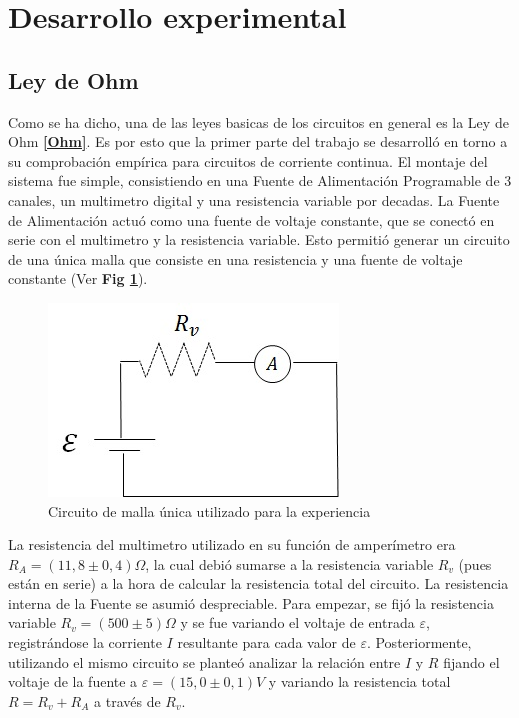 \documentclass[11pt,a4paper]{article}
\begin{document}
\section{Desarrollo experimental}

\subsection{Ley de Ohm}

Como se ha dicho, una de las leyes basicas de los circuitos en general es la Ley de Ohm \textbf{\eqref{Ohm}}. Es por esto que la primer parte del trabajo se desarrolló en torno a su comprobación empírica para circuitos de corriente continua. El montaje del sistema fue simple, consistiendo en una Fuente de Alimentación Programable de 3 canales, un multimetro digital y una resistencia variable por decadas. La Fuente de Alimentación actuó como una fuente de voltaje constante, que se conectó en serie con el multimetro y la resistencia variable. Esto permitió generar un circuito de una única malla que consiste en una resistencia y una fuente de voltaje constante (Ver \textbf{Fig \ref{fig:circ_simp}}).


\begin{figure}[h]
  \centering
  \includegraphics[scale= 0.6]{Circuito_simple}
  \caption{Circuito de malla única utilizado para la experiencia}
  \label{fig:circ_simp}
\end{figure}

La resistencia del multimetro utilizado en su función de amperímetro era $R_{A} = (11,8 \pm 0,4) \Omega$, la cual debió sumarse a la resistencia variable $R_v$ (pues están en serie) a la hora de calcular la resistencia total del circuito. La resistencia interna de la Fuente se asumió despreciable. Para empezar, se fijó la resistencia variable $R_v = (500 \pm 5)\Omega$ y se fue variando el voltaje de entrada $\varepsilon$, registrándose la corriente $I$ resultante para cada valor de $\varepsilon$. Posteriormente, utilizando el mismo circuito se planteó analizar la relación entre $I$ y $R$ fijando el voltaje de la fuente a $\varepsilon = (15,0 \pm 0,1)V$ y variando la resistencia total $R = R_v + R_A$ a través de $R_v$. 
\end{document}
